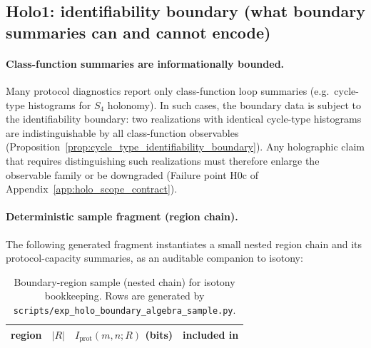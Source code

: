 \subsection{Holo1: identifiability boundary (what boundary summaries can and cannot encode)}
\label{subsec:holo1_identifiability_boundary}

\paragraph{Class-function summaries are informationally bounded.}
\AuditTag Many protocol diagnostics report only class-function loop summaries (e.g.\ cycle-type histograms for $S_4$ holonomy).
In such cases, the boundary data is subject to the identifiability boundary:
two realizations with identical cycle-type histograms are indistinguishable by all class-function observables
(Proposition~\ref{prop:cycle_type_identifiability_boundary}).
Any holographic claim that requires distinguishing such realizations must therefore enlarge the observable family
or be downgraded (Failure point H0c of Appendix~\ref{app:holo_scope_contract}).

\paragraph{Deterministic sample fragment (region chain).}
\AuditTag The following generated fragment instantiates a small nested region chain and its protocol-capacity summaries,
as an auditable companion to isotony:
\begin{table}[H]
\centering
\scriptsize
\setlength{\tabcolsep}{6pt}
\renewcommand{\arraystretch}{1.15}
\begin{tabular}{c c c c}
\toprule
region & $|R|$ & $I_{\mathrm{prot}}(m,n;R)$ (bits) & included in \\
\midrule
%
\end{tabular}
\caption{Boundary-region sample (nested chain) for isotony bookkeeping. Rows are generated by \texttt{scripts/exp\_holo\_boundary\_algebra\_sample.py}.}
\label{tab:holo_boundary_algebra_sample}
\end{table}
%
